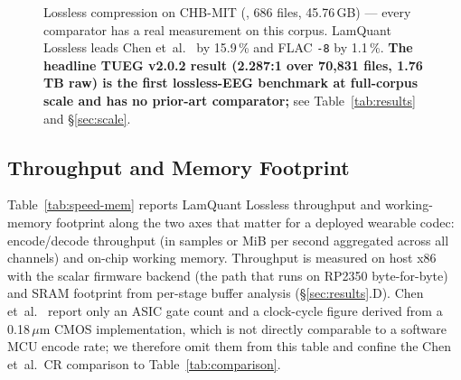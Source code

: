 \documentclass[journal]{IEEEtran}
\begin{document}
\begin{figure}[!t]
\centering
{}
\caption{Lossless compression on CHB-MIT
(\cite{shoeb2009}, 686 files, 45.76\,GB) — every comparator has a
real measurement on this corpus. LamQuant Lossless leads Chen
et~al.~\cite{chen2018vlsi} by 15.9\,\% and FLAC \texttt{-8} by
1.1\,\%. \textbf{The headline TUEG v2.0.2 result (2.287:1 over
70{,}831 files, 1.76\,TB raw) is the first lossless-EEG benchmark
at full-corpus scale and has no prior-art comparator;} see
Table~\ref{tab:results} and \S\ref{sec:scale}.}
\label{fig:cr-bar}
\end{figure}

\subsection{Throughput and Memory Footprint}
Table~\ref{tab:speed-mem} reports LamQuant Lossless throughput and
working-memory footprint along the two axes that matter for a
deployed wearable codec: encode/decode throughput (in samples or
MiB per second aggregated across all channels) and on-chip
working memory. Throughput is measured on host x86 with the
scalar firmware backend (the path that runs on RP2350
byte-for-byte) and SRAM footprint from per-stage buffer analysis
(\S\ref{sec:results}.D). Chen et~al.~\cite{chen2018vlsi} report
only an ASIC gate count and a clock-cycle figure derived from a
0.18\,$\mu$m CMOS implementation, which is not directly
comparable to a software MCU encode rate; we therefore omit them
from this table and confine the Chen et~al.\ CR comparison to
Table~\ref{tab:comparison}.
\end{document}
